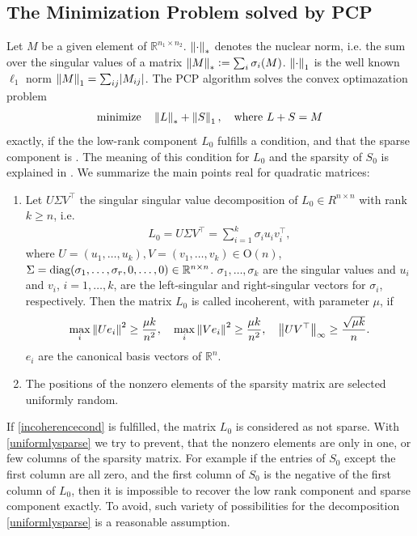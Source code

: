 \subsection{The Minimization Problem solved by PCP}\label{sec:pcpproblem}
Let $M$ be a given element of $\mathbb R^{n_1\times n_2}$. $\left\Vert\cdot\right\Vert_*$ denotes the nuclear norm, i.e. the sum over the singular values of a matrix $\left\Vert M\right\Vert_* \vcentcolon= \sum_i \sigma_i(M)$. $\left\Vert\cdot\right\Vert_1$ is the well known $\ell_1$ norm $\left\Vert M\right\Vert_1 = \sum_{ij} \lvert M_{ij} \rvert$. The PCP algorithm solves the convex optimazation problem
\begin{align}
\label{pcpoptproblem}
 \mathrm{minimize} \quad \left\Vert L\right\Vert_* + \left\Vert S\right\Vert_1, \quad \text{where } L+S=M
\end{align}
exactly, if the the low-rank component $L_0$ fulfills a  condition, and that the sparse component is . The meaning of this  condition for $L_0$ and the  sparsity of $S_0$ is explained in \cite[subsection 1.3]{candes2009robust}. We summarize the main points real for quadratic matrices:
\par
\begin{enumerate}[label=(\roman*),ref=(\roman*)]
 \item \label{incoherencecond} Let $U\Sigma V^\top$ the singular singular value decomposition of $L_0 \in R^{n\times n}$ with rank $k\ge n$, i.e.
\begin{align}
 L_0 = U\Sigma V^\top = \sum_{i=1}^k \sigma_i u_i v_i^\top,
\end{align}
where $U=(u_1,\dots,u_k),V=(v_1,\dots,v_k) \in \mathrm{O}(n)$, $\Sigma=\mathrm{diag}(\sigma_1,\dots,\sigma_r,0,\dots,0) \in \mathbb R^{n\times n}$. $\sigma_1,\dots,\sigma_k$ are the singular values and $u_i$ and $v_i$, $i=1,\dots,k$, are the left-singular and right-singular vectors for $\sigma_i$, respectively. Then the matrix $L_0$ is called incoherent, with parameter $\mu$, if
\begin{align}
 \max_i \left\Vert U e_i\right\Vert^2 \ge \dfrac{\mu k}{n^2},\quad  \max_i \left\Vert V e_i\right\Vert^2 \ge \dfrac{\mu k}{n^2}, \quad \left\Vert UV^\top\right\Vert_\infty \ge \dfrac{\sqrt{\mu k}}{n}.
\end{align}
$e_i$ are the canonical basis vectors of $\mathbb R^n$. 
 \item \label{uniformlysparse} The positions of the nonzero elements of the sparsity matrix are selected uniformly random.
\end{enumerate}
If \ref{incoherencecond} is fulfilled, the matrix $L_0$ is considered as not sparse. With \ref{uniformlysparse} we try to prevent, that the nonzero elements are only in one, or few columns of the sparsity matrix. For example if the entries of $S_0$ except the first column are all zero, and the first column of $S_0$ is the negative of the first column of $L_0$, then it is impossible to recover the low rank component and sparse component exactly. To avoid, such variety of possibilities for the decomposition 
\ref{uniformlysparse} is a reasonable assumption.

